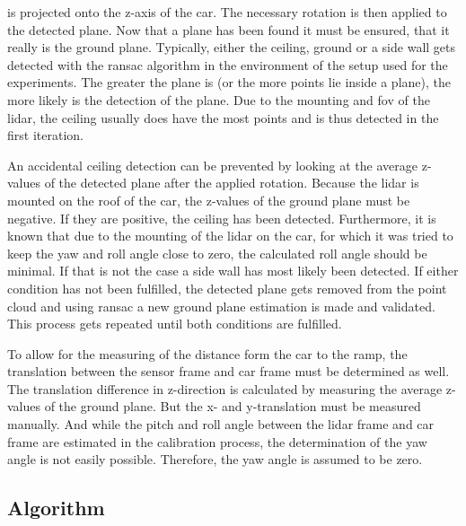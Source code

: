 is projected onto the z-axis of the car.
The necessary rotation is then applied to the detected plane.
Now that a plane has been found it must be ensured, that it really is the ground plane.
Typically, either the ceiling, ground or a side wall gets detected with the \gls{ransac} algorithm in the environment of the setup used for the experiments.
The greater the plane is (or the more points lie inside a plane), the more likely is the detection of the plane.
Due to the mounting and \gls{fov} of the \gls{lidar}, the ceiling usually does have the most points and is thus detected in the first iteration.\par
An accidental ceiling detection can be prevented by looking at the average z-values of the detected plane after the applied rotation.
Because the \gls{lidar} is mounted on the roof of the car, the z-values of the ground plane must be negative.
If they are positive, the ceiling has been detected.
Furthermore, it is known that due to the mounting of the \gls{lidar} on the car, for which it was tried to keep the yaw and roll angle close to zero, the calculated roll angle should be minimal.
If that is not the case a side wall has most likely been detected.
If either condition has not been fulfilled, the detected plane gets removed from the point cloud and using \gls{ransac} a new ground plane estimation is made and validated.
This process gets repeated until both conditions are fulfilled.\par
To allow for the measuring of the distance form the car to the ramp, the translation between the sensor frame and car frame must be determined as well.
The translation difference in z-direction is calculated by measuring the average z-values of the ground plane.
But the x- and y-translation must be measured manually.
And while the pitch and roll angle between the \gls{lidar} frame and car frame are estimated in the calibration process, the determination of the yaw angle is not easily possible.
Therefore, the yaw angle is assumed to be zero.

\subsection{Algorithm}
\label{ssec:algorithm_lidar}
